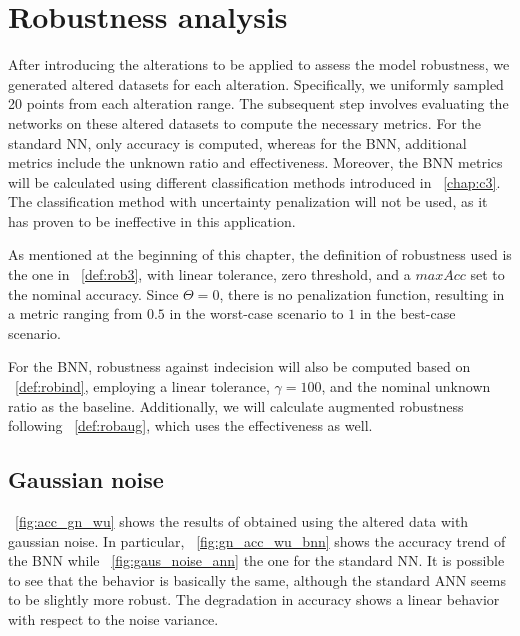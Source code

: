 \section{Robustness analysis}

After introducing the alterations to be applied to assess the model robustness, we generated altered datasets for each alteration. Specifically, we uniformly sampled 20 points from each alteration range. The subsequent step involves evaluating the networks on these altered datasets to compute the necessary metrics. For the standard NN, only accuracy is computed, whereas for the BNN, additional metrics include the unknown ratio and effectiveness. Moreover, the BNN metrics will be calculated using different classification methods introduced in \Chap~\ref{chap:c3}. The classification method with uncertainty penalization will not be used, as it has proven to be ineffective in this application.

As mentioned at the beginning of this chapter, the definition of robustness used is the one in \Def~\ref{def:rob3}, with linear tolerance, zero threshold, and a $maxAcc$ set to the nominal accuracy. Since $\Theta=0$, there is no penalization function, resulting in a metric ranging from $0.5$ in the worst-case scenario to $1$ in the best-case scenario.

For the BNN, robustness against indecision will also be computed based on \Def~\ref{def:robind}, employing a linear tolerance, $\gamma=100$, and the nominal unknown ratio as the baseline. Additionally, we will calculate augmented robustness following \Def~\ref{def:robaug}, which uses the effectiveness as well.

\subsection{Gaussian noise}

\Fig~\ref{fig:acc_gn_wu} shows the results of obtained using the altered data with gaussian noise. In particular, \Fig~\ref{fig:gn_acc_wu_bnn} shows the accuracy trend of the BNN while \Fig~\ref{fig:gaus_noise_ann} the one for the standard NN. It is possible to see that the behavior is basically the same, although the standard ANN seems to be slightly more robust. The degradation in accuracy shows a linear behavior with respect to the noise variance.


